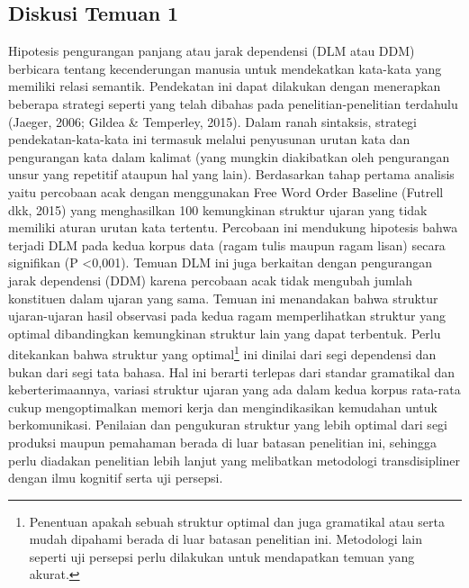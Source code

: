 \subsection{Diskusi Temuan 1}
Hipotesis pengurangan panjang atau jarak dependensi (DLM atau DDM) berbicara tentang kecenderungan manusia untuk mendekatkan kata-kata yang memiliki relasi semantik. Pendekatan ini dapat dilakukan dengan menerapkan beberapa strategi seperti yang telah dibahas pada penelitian-penelitian terdahulu (Jaeger, 2006; Gildea & Temperley, 2015). Dalam ranah sintaksis, strategi pendekatan-kata-kata ini termasuk melalui penyusunan urutan kata dan pengurangan kata dalam kalimat (yang mungkin diakibatkan oleh pengurangan unsur yang repetitif ataupun hal yang lain). Berdasarkan tahap pertama analisis yaitu percobaan acak dengan menggunakan Free Word Order Baseline (Futrell dkk, 2015) yang menghasilkan 100 kemungkinan struktur ujaran yang tidak memiliki aturan urutan kata tertentu. Percobaan ini mendukung hipotesis bahwa terjadi DLM pada kedua korpus data (ragam tulis maupun ragam lisan) secara signifikan (P \textless 0,001). Temuan DLM ini juga berkaitan dengan pengurangan jarak dependensi (DDM) karena percobaan acak tidak mengubah jumlah konstituen dalam ujaran yang sama. Temuan ini menandakan bahwa struktur ujaran-ujaran hasil observasi pada kedua ragam memperlihatkan struktur yang optimal dibandingkan kemungkinan struktur lain yang dapat terbentuk. Perlu ditekankan bahwa struktur yang optimal\footnote{Penentuan apakah sebuah struktur optimal dan juga gramatikal atau serta mudah dipahami berada di luar batasan penelitian ini. Metodologi lain seperti uji persepsi perlu dilakukan untuk mendapatkan temuan yang akurat.} ini dinilai dari segi dependensi dan bukan dari segi tata bahasa. Hal ini berarti terlepas dari standar gramatikal dan keberterimaannya, variasi struktur ujaran yang ada dalam kedua korpus rata-rata cukup mengoptimalkan memori kerja dan mengindikasikan kemudahan untuk berkomunikasi. Penilaian dan pengukuran struktur yang lebih optimal dari segi produksi maupun pemahaman berada di luar batasan penelitian ini, sehingga perlu diadakan penelitian lebih lanjut yang melibatkan metodologi transdisipliner dengan ilmu kognitif serta uji persepsi.


